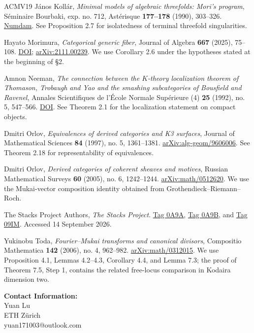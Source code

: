 \documentclass[11pt,a4paper]{article}
\begin{document}
\begin{thebibliography}{ACMV19}
 János Kollár, \emph{Minimal models of algebraic threefolds: Mori's program}, Séminaire Bourbaki, exp. no. 712, Astérisque \textbf{177--178} (1990), 303--326. \href{https://www.numdam.org/item/SB_1988-1989__31__303_0/}{Numdam}. See Proposition 2.7 for isolatedness of terminal threefold singularities.

 Hayato Morimura, \emph{Categorical generic fiber}, Journal of Algebra \textbf{667} (2025), 75--108. \href{https://doi.org/10.1016/j.jalgebra.2024.12.013}{DOI}; \href{https://arxiv.org/abs/2111.00239}{arXiv:2111.00239}. We use Corollary 2.6 under the hypotheses stated at the beginning of \S{}2.

 Amnon Neeman, \emph{The connection between the $K$-theory localization theorem of Thomason, Trobaugh and Yao and the smashing subcategories of Bousfield and Ravenel}, Annales Scientifiques de l'École Normale Supérieure (4) \textbf{25} (1992), no. 5, 547--566. \href{https://doi.org/10.24033/asens.1659}{DOI}. See Theorem 2.1 for the localization statement on compact objects.

 Dmitri Orlov, \emph{Equivalences of derived categories and K3 surfaces}, Journal of Mathematical Sciences \textbf{84} (1997), no. 5, 1361--1381. \href{https://arxiv.org/abs/alg-geom/9606006}{arXiv:alg-geom/9606006}. See Theorem 2.18 for representability of equivalences.

 Dmitri Orlov, \emph{Derived categories of coherent sheaves and motives}, Russian Mathematical Surveys \textbf{60} (2005), no. 6, 1242--1244. \href{https://arxiv.org/abs/math/0512620}{arXiv:math/0512620}. We use the Mukai-vector composition identity obtained from Grothendieck--Riemann--Roch.

 The Stacks Project Authors, \emph{The Stacks Project}. \href{https://stacks.math.columbia.edu/tag/0A9A}{Tag 0A9A}, \href{https://stacks.math.columbia.edu/tag/0A9B}{Tag 0A9B}, and \href{https://stacks.math.columbia.edu/tag/09IM}{Tag 09IM}. Accessed 14 September 2026.

 Yukinobu Toda, \emph{Fourier--Mukai transforms and canonical divisors}, Compositio Mathematica \textbf{142} (2006), no. 4, 962--982. \href{https://arxiv.org/abs/math/0312015}{arXiv:math/0312015}. We use Proposition 4.1, Lemmas 4.2--4.3, Corollary 4.4, and Lemma 7.3; the proof of Theorem 7.5, Step 1, contains the related free-locus comparison in Kodaira dimension two.

\end{thebibliography}

\bigskip
\begin{samepage}
\noindent\textbf{Contact Information:}\\
Yuan Lu\\
ETH Zürich\\
yuan171003@outlook.com
\par
\end{samepage}
\end{document}
